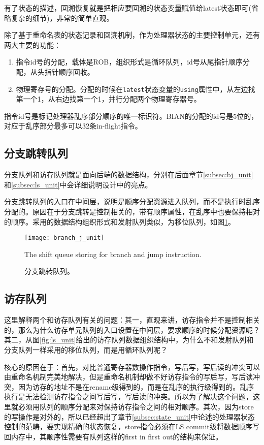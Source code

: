 有了状态的描述，回溯恢复就是把相应要回溯的状态变量赋值给latest状态即可(省略复杂的细节)，非常的简单直观。

除了基于重命名表的状态记录和回溯机制，作为处理器状态的主要控制单元，还有两大主要的功能：
\begin{enumerate}[label=(\alph*)]
	\item 指令id号的分配，载体是ROB，组织形式是循环队列，id号从尾指针顺序分配，从头指针顺序回收。
	\item 物理寄存号的分配。分配的时候在\texttt{latest}状态变量的\texttt{using}属性中，从左边找第一个1，从右边找第一个1，并行分配两个物理寄存器号。
\end{enumerate}

指令id号是标记处理器乱序部分顺序的唯一标识符。BIAN的分配的id号是5位的，对应于乱序部分最多可以32条in-flight指令。

\subsection{分支跳转队列}

分支队列和访存队列就是面向后端的数据结构，分别在后面章节\ref{subsec:bj_unit}和\ref{subsec:ls_unit}中会详细说明设计中的亮点。

分支跳转队列的入口在中间层，说明是顺序分配资源进入队列，而不是执行时乱序分配的。原因在于分支跳转是控制相关的，带有顺序属性，在乱序中也要保持相对的顺序。采用的数据结构组织形式和发射队列类似，为移位队列，如图\ref{fig:bj_unit}。
\begin{figure}[!htbp]
	\centering
	\texttt{[image: branch\_j\_unit]}
	\caption{分支跳转队列。}{The shift queue storing for branch and jump instruction.}
	\label{fig:bj_unit}
\end{figure}

\subsection{访存队列}\label{subsec:ls_queue}

这里解释两个和访存队列有关的问题：其一，直观来讲，访存指令并不是控制相关的，那么为什么访存单元队列的入口设置在中间层，要求顺序的时候分配资源呢？其二，从图\ref{fig:ls_unit}给出的访存队列数据组织结构中，为什么不和发射队列和分支队列一样采用的移位队列，而是用循环队列呢？

核心的原因在于：首先，对比普通寄存器数操作指令，写后写，写后读的冲突可以由重命名机制完美地解决，但是重命名机制却做不好访存指令的写后写，写后读冲突，因为访存的地址不是在rename级得到的，而是在乱序的执行级得到的。乱序执行是无法检测访存指令之间写后写，写后读的冲突。所以为了解决这个问题，这里就必须用队列的顺序分配来对保持访存指令之间的相对顺序。其次，因为store的写操作是对外的，所以已经超出了章节\ref{subsec:state_unit}中论述的处理器状态控制的范畴，要实现精确的状态恢复，store指令必须在LS commit级将数据顺序写回内存中，其顺序性需要有队列这样的first in first out的结构来保证。

